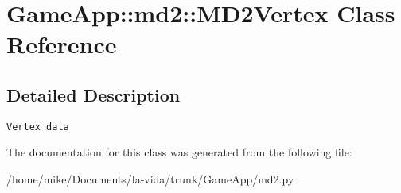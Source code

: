 \hypertarget{classGameApp_1_1md2_1_1MD2Vertex}{
\section{GameApp::md2::MD2Vertex Class Reference}
\label{classGameApp_1_1md2_1_1MD2Vertex}
}


\subsection{Detailed Description}


\footnotesize\begin{verbatim}Vertex data \end{verbatim}
\normalsize
 

The documentation for this class was generated from the following file:\begin{CompactItemize}
\item 
/home/mike/Documents/la-vida/trunk/GameApp/md2.py\end{CompactItemize}
